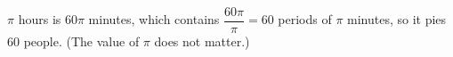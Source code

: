 $\pi$ hours is $60\pi$ minutes, which contains $\dfrac{60\pi}{\pi}=\boxed{60}$ periods of $\pi$ minutes, so it pies $60$ people. (The value of $\pi$ does not matter.)
